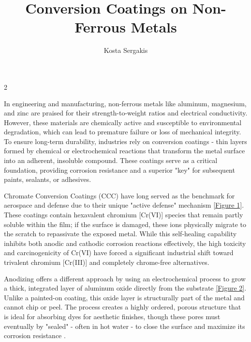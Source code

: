 \documentclass[portrait]{a0poster}
\title{Conversion Coatings on Non-Ferrous Metals}
\author[1]{Kosta Sergakis}
\affil[1]{Michigan State University, East Lansing, Michigan}
\date{\vspace{-5ex}}
\begin{document}
\maketitle
\thispagestyle{empty}
\darkheader

\begin{multicols}{2}
\large

  
  In engineering and manufacturing, non-ferrous metals like aluminum, magnesium, and zinc are praised for their strength-to-weight ratios and electrical conductivity. However, these materials are chemically active and susceptible to environmental degradation, which can lead to premature failure or loss of mechanical integrity. To ensure long-term durability, industries rely on conversion coatings - thin layers formed by chemical or electrochemical reactions that transform the metal surface into an adherent, insoluble compound. These coatings serve as a critical foundation, providing corrosion resistance and a superior "key" for subsequent paints, sealants, or adhesives.


  Chromate Conversion Coatings (CCC) have long served as the benchmark for aerospace and defense due to their unique "active defense" mechanism \hyperref[ccc_diagram]{[Figure 1]}. These coatings contain hexavalent chromium [Cr(VI)] species that remain partly soluble within the film; if the surface is damaged, these ions physically migrate to the scratch to repassivate the exposed metal. While this self-healing capability inhibits both anodic and cathodic corrosion reactions effectively, the high toxicity and carcinogenicity of Cr(VI) have forced a significant industrial shift toward trivalent chromium [Cr(III)] and completely chrome-free alternatives.

  \vspace{0.75cm}

  Anodizing offers a different approach by using an electrochemical process to grow a thick, integrated layer of aluminum oxide directly from the substrate \hyperref[anodizing_diagram]{[Figure 2]}. Unlike a painted-on coating, this oxide layer is structurally part of the metal and cannot chip or peel. The process creates a highly ordered, porous structure that is ideal for absorbing dyes for aesthetic finishes, though these pores must eventually by "sealed" - often in hot water - to close the surface and maximize its corrosion resistance \autocite{asm_surface_2007}.


\end{multicols}
\end{document}
